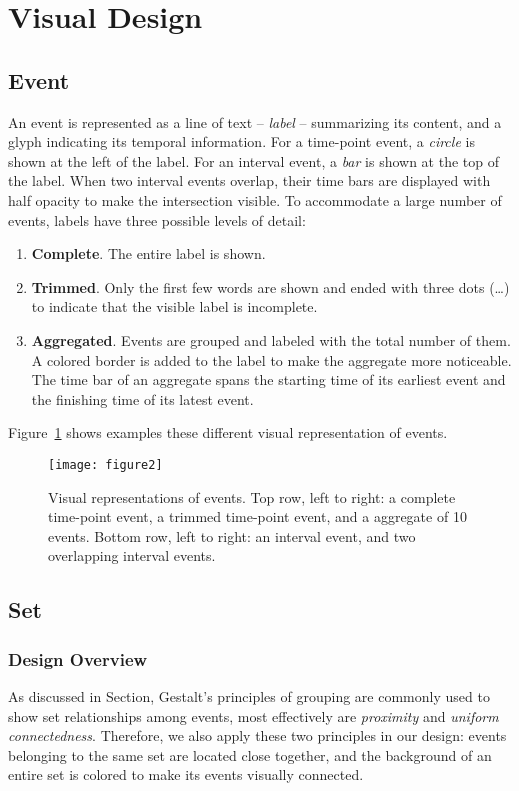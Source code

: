 \section{Visual Design}

\subsection{Event}
An event is represented as a line of text -- \emph{label} -- summarizing its content, and a glyph indicating its temporal information. For a time-point event, a \emph{circle} is shown at the left of the label. For an interval event, a \emph{bar} is shown at the top of the label. When two interval events overlap, their time bars are displayed with half opacity to make the intersection visible. To accommodate a large number of events, labels have three possible levels of detail: 
\begin{enumerate}
	\item \textbf{Complete}. The entire label is shown.
	\item \textbf{Trimmed}. Only the first few words are shown and ended with three dots (\dots) to indicate that the visible label is incomplete.
	\item \textbf{Aggregated}. Events are grouped and labeled with the total number of them. A colored border is added to the label to make the aggregate more noticeable. The time bar of an aggregate spans the starting time of its earliest event and the finishing time of its latest event.
\end{enumerate}	

Figure~\ref{fig:event-representation} shows examples these different visual representation of events.

\begin{figure}[!htb]
\centering
\texttt{[image: figure2]}\caption{Visual representations of events. Top row, left to right: a complete time-point event, a trimmed time-point event, and a aggregate of 10 events. Bottom row, left to right: an interval event, and two overlapping interval events.}
\label{fig:event-representation}
\end{figure}

\subsection{Set}
\subsubsection{Design Overview}
As discussed in Section, Gestalt's principles of grouping are commonly used to show set relationships among events, most effectively are \emph{proximity} and \emph{uniform connectedness}. Therefore, we also apply these two principles in our design: events belonging to the same set are located close together, and the background of an entire set is colored to make its events visually connected.

